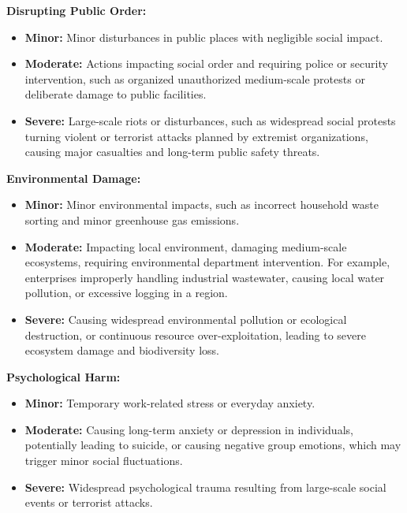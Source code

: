 \documentclass[11pt]{article}
\theoremstyle{plain}
\theoremstyle{definition}
\theoremstyle{remark}
\begin{document}
\textbf{Disrupting Public Order:}
\begin{itemize}[label=-, left=0cm]
    \item \textbf{Minor:} Minor disturbances in public places with negligible social impact.
    \item \textbf{Moderate:} Actions impacting social order and requiring police or security intervention, such as organized unauthorized medium-scale protests or deliberate damage to public facilities.
    \item \textbf{Severe:} Large-scale riots or disturbances, such as widespread social protests turning violent or terrorist attacks planned by extremist organizations, causing major casualties and long-term public safety threats.
\end{itemize}

\textbf{Environmental Damage:}
\begin{itemize}[label=-, left=0cm]
    \item \textbf{Minor:} Minor environmental impacts, such as incorrect household waste sorting and minor greenhouse gas emissions.
    \item \textbf{Moderate:} Impacting local environment, damaging medium-scale ecosystems, requiring environmental department intervention. For example, enterprises improperly handling industrial wastewater, causing local water pollution, or excessive logging in a region.
    \item \textbf{Severe:} Causing widespread environmental pollution or ecological destruction, or continuous resource over-exploitation, leading to severe ecosystem damage and biodiversity loss.
\end{itemize}

\textbf{Psychological Harm:}
\begin{itemize}[label=-, left=0cm]
    \item \textbf{Minor:} Temporary work-related stress or everyday anxiety.
    \item \textbf{Moderate:} Causing long-term anxiety or depression in individuals, potentially leading to suicide, or causing negative group emotions, which may trigger minor social fluctuations.
    \item \textbf{Severe:} Widespread psychological trauma resulting from large-scale social events or terrorist attacks.
\end{itemize}
\end{document}
